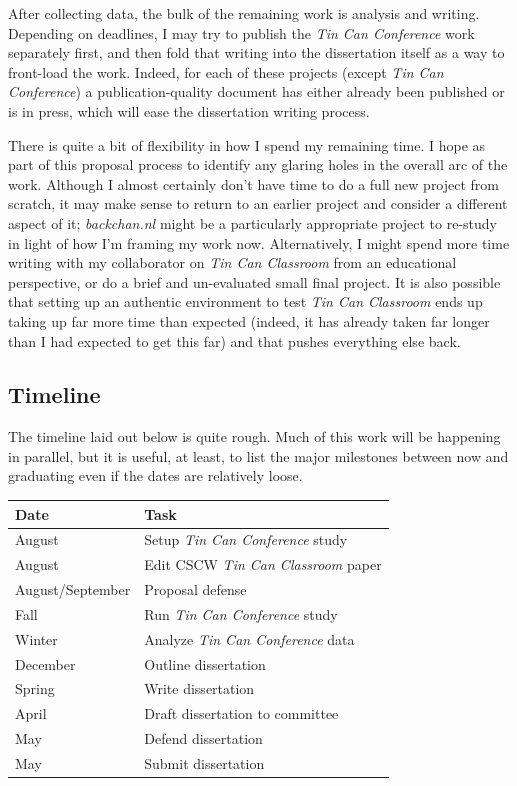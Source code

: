 \documentclass{tufte-handout}
\begin{document}
After collecting data, the bulk of the remaining work is analysis and writing. Depending on deadlines, I may try to publish the \emph{Tin Can Conference} work separately first, and then fold that writing into the dissertation itself as a way to front-load the work. Indeed, for each of these projects (except \emph{Tin Can Conference}) a publication-quality document has either already been published or is in press, which will ease the dissertation writing process.

There is quite a bit of flexibility in how I spend my remaining time. I hope as part of this proposal process to identify any glaring holes in the overall arc of the work. Although I almost certainly don't have time to do a full new project from scratch, it may make sense to return to an earlier project and consider a different aspect of it; \emph{backchan.nl} might be a particularly appropriate project to re-study in light of how I'm framing my work now. Alternatively, I might spend more time writing with my collaborator on \emph{Tin Can Classroom} from an educational perspective, or do a brief and un-evaluated small final project. It is also possible that setting up an authentic environment to test \emph{Tin Can Classroom} ends up taking up far more time than expected (indeed, it has already taken far longer than I had expected to get this far) and that pushes everything else back.



\subsection{Timeline}

The timeline laid out below is quite rough. Much of this work will be happening in parallel, but it is useful, at least, to list the major milestones between now and graduating even if the dates are relatively loose.

\vspace{1em}
\begin{tabular}{ll}
\toprule
Date & Task \\
\midrule

August				& Setup \emph{Tin Can Conference} study \\
August				& Edit CSCW \emph{Tin Can Classroom} paper \\
August/September	& Proposal defense \\
Fall				& Run \emph{Tin Can Conference} study \\
Winter	 			& Analyze \emph{Tin Can Conference} data \\
December			& Outline dissertation \\
Spring				& Write dissertation \\
April				& Draft dissertation to committee \\
May 				& Defend dissertation \\
May					& Submit dissertation \\
\bottomrule

\end{tabular}





\end{document}
